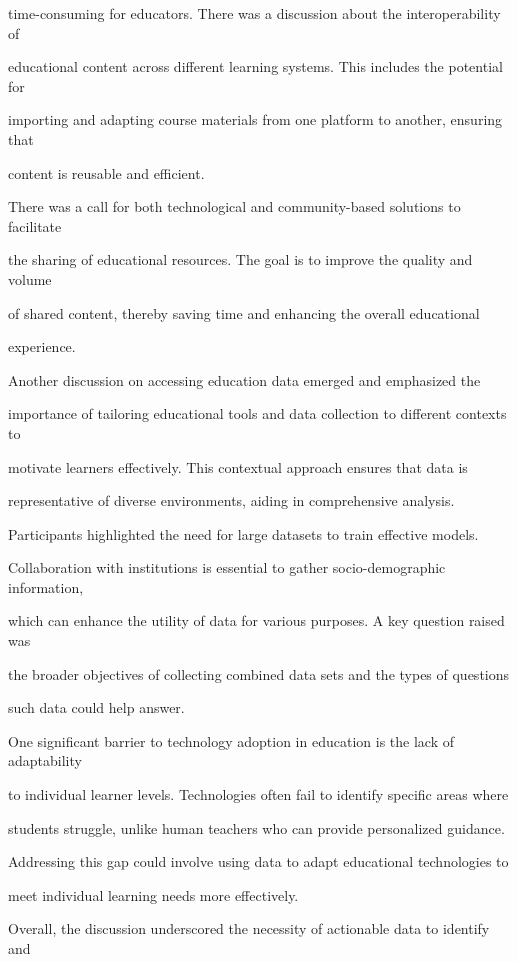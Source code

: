 \documentclass[11pt]{article}
\begin{document}
time-consuming for educators. There was a discussion about the interoperability of

educational content across different learning systems. This includes the potential for

importing and adapting course materials from one platform to another, ensuring that

content is reusable and efficient.

There was a call for both technological and community-based solutions to facilitate

the sharing of educational resources. The goal is to improve the quality and volume

of shared content, thereby saving time and enhancing the overall educational

experience.

Another discussion on accessing education data emerged and emphasized the

importance of tailoring educational tools and data collection to different contexts to

motivate learners effectively. This contextual approach ensures that data is

representative of diverse environments, aiding in comprehensive analysis.

Participants highlighted the need for large datasets to train effective models.

Collaboration with institutions is essential to gather socio-demographic information,

which can enhance the utility of data for various purposes. A key question raised was

the broader objectives of collecting combined data sets and the types of questions

such data could help answer.

One significant barrier to technology adoption in education is the lack of adaptability

to individual learner levels. Technologies often fail to identify specific areas where

students struggle, unlike human teachers who can provide personalized guidance.

Addressing this gap could involve using data to adapt educational technologies to

meet individual learning needs more effectively.

Overall, the discussion underscored the necessity of actionable data to identify and
\end{document}
